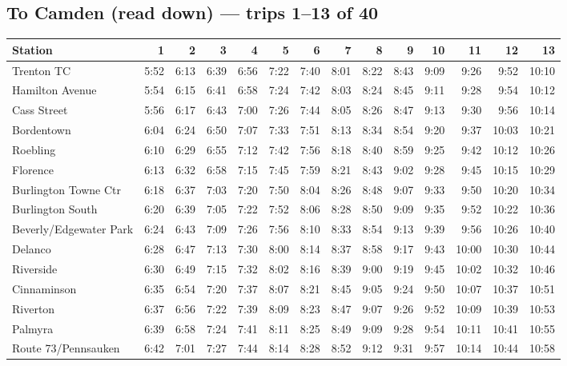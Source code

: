 \subsection*{To Camden (read down) --- trips 1--13 of 40}
\begin{center}\footnotesize\setlength{\tabcolsep}{3pt}\begin{tabular}{@{}lrrrrrrrrrrrrr@{}}\toprule
Station & 1 & 2 & 3 & 4 & 5 & 6 & 7 & 8 & 9 & 10 & 11 & 12 & 13 \\\midrule
Trenton TC & 5:52 & 6:13 & 6:39 & 6:56 & 7:22 & 7:40 & 8:01 & 8:22 & 8:43 & 9:09 & 9:26 & 9:52 & 10:10 \\
Hamilton Avenue & 5:54 & 6:15 & 6:41 & 6:58 & 7:24 & 7:42 & 8:03 & 8:24 & 8:45 & 9:11 & 9:28 & 9:54 & 10:12 \\
Cass Street & 5:56 & 6:17 & 6:43 & 7:00 & 7:26 & 7:44 & 8:05 & 8:26 & 8:47 & 9:13 & 9:30 & 9:56 & 10:14 \\
Bordentown & 6:04 & 6:24 & 6:50 & 7:07 & 7:33 & 7:51 & 8:13 & 8:34 & 8:54 & 9:20 & 9:37 & 10:03 & 10:21 \\
Roebling & 6:10 & 6:29 & 6:55 & 7:12 & 7:42 & 7:56 & 8:18 & 8:40 & 8:59 & 9:25 & 9:42 & 10:12 & 10:26 \\
Florence & 6:13 & 6:32 & 6:58 & 7:15 & 7:45 & 7:59 & 8:21 & 8:43 & 9:02 & 9:28 & 9:45 & 10:15 & 10:29 \\
Burlington Towne Ctr & 6:18 & 6:37 & 7:03 & 7:20 & 7:50 & 8:04 & 8:26 & 8:48 & 9:07 & 9:33 & 9:50 & 10:20 & 10:34 \\
Burlington South & 6:20 & 6:39 & 7:05 & 7:22 & 7:52 & 8:06 & 8:28 & 8:50 & 9:09 & 9:35 & 9:52 & 10:22 & 10:36 \\
Beverly/Edgewater Park & 6:24 & 6:43 & 7:09 & 7:26 & 7:56 & 8:10 & 8:33 & 8:54 & 9:13 & 9:39 & 9:56 & 10:26 & 10:40 \\
Delanco & 6:28 & 6:47 & 7:13 & 7:30 & 8:00 & 8:14 & 8:37 & 8:58 & 9:17 & 9:43 & 10:00 & 10:30 & 10:44 \\
Riverside & 6:30 & 6:49 & 7:15 & 7:32 & 8:02 & 8:16 & 8:39 & 9:00 & 9:19 & 9:45 & 10:02 & 10:32 & 10:46 \\
Cinnaminson & 6:35 & 6:54 & 7:20 & 7:37 & 8:07 & 8:21 & 8:45 & 9:05 & 9:24 & 9:50 & 10:07 & 10:37 & 10:51 \\
Riverton & 6:37 & 6:56 & 7:22 & 7:39 & 8:09 & 8:23 & 8:47 & 9:07 & 9:26 & 9:52 & 10:09 & 10:39 & 10:53 \\
Palmyra & 6:39 & 6:58 & 7:24 & 7:41 & 8:11 & 8:25 & 8:49 & 9:09 & 9:28 & 9:54 & 10:11 & 10:41 & 10:55 \\
Route 73/Pennsauken & 6:42 & 7:01 & 7:27 & 7:44 & 8:14 & 8:28 & 8:52 & 9:12 & 9:31 & 9:57 & 10:14 & 10:44 & 10:58 \\

\end{tabular}
\end{center}
